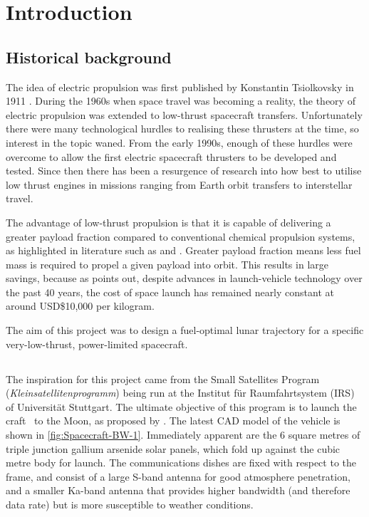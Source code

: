 \chapter{Introduction} \label{cha:Introduction}
 
\section{Historical background} \label{sec:Historical-background}

The idea of electric propulsion was first published by Konstantin Tsiolkovsky in 1911 \parencite{Choueiri2004}. During the 1960s when space travel was becoming a reality, the theory of electric propulsion was extended to low-thrust spacecraft transfers. Unfortunately there were many technological hurdles to realising these thrusters at the time, so interest in the topic waned. From the early 1990s, enough of these hurdles were overcome to allow the first electric spacecraft thrusters to be developed and tested. Since then there has been a resurgence of research into how best to utilise low thrust engines in missions ranging from Earth orbit transfers to interstellar travel.
 
The advantage of low-thrust propulsion is that it is capable of delivering a greater payload fraction compared to conventional chemical propulsion systems, as highlighted in literature such as \textcite{Kluever1995} and \textcite{Yang2007}. Greater payload fraction means less fuel mass is required to propel a given payload into orbit. This results in large savings, because as \textcite{Manzella2008} points out, despite advances in launch-vehicle technology over the past 40 years, the cost of space launch has remained nearly constant at around USD\$10,000 per kilogram.
 
The aim of this project was to design a fuel-optimal lunar trajectory for a specific very-low-thrust, power-limited spacecraft.

\section{\BW} \label{sec:Spacecraft}

The inspiration for this project came from the Small Satellites Program (\emph{Kleinsatellitenprogramm}) being run at the Institut f\"{u}r Raumfahrtsystem (IRS) of Universit\"{a}t Stuttgart. The ultimate objective of this program is to launch the craft \BW\ to the Moon, as proposed by \textcite{Roeser2006}. The latest CAD model of the vehicle is shown in \autoref{fig:Spacecraft-BW-1}. Immediately apparent are the 6 square metres of triple junction gallium arsenide solar panels, which fold up against the cubic metre body for launch. The communications dishes are fixed with respect to the frame, and consist of a large S-band antenna for good atmosphere penetration, and a smaller Ka-band antenna that provides higher bandwidth (and therefore data rate) but is more susceptible to weather conditions.

